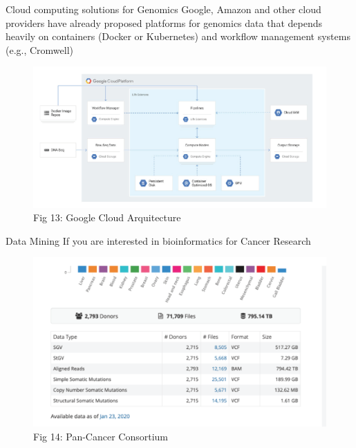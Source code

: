 \documentclass[11pt, aspectratio=43]{beamer}
\begin{document}
	\begin{frame}{Cloud computing solutions for Genomics}
		Google, Amazon and other cloud providers have already proposed platforms
		for genomics data that depends heavily on containers (Docker or
		Kubernetes) and workflow management systems (e.g., Cromwell)
		
		\begin{figure}[h]
			\centering
			\includegraphics[scale=0.45]{Figures/google.png}
			\caption{Fig 13: Google Cloud Arquitecture}
		\end{figure}
		
	\end{frame}
	\begin{frame}{Data Mining}
		If you are interested in bioinformatics for Cancer Research
		
		\begin{figure}[h]
			\centering
			\includegraphics[scale=0.45]{Figures/pancancer.png}
			\caption{Fig 14: Pan-Cancer Consortium}
		\end{figure}
		
	\end{frame}
\end{document}
